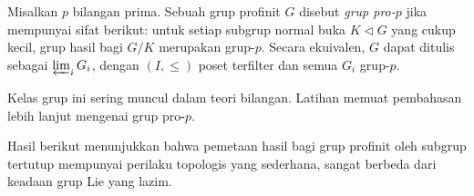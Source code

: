\begin{definition}
	Misalkan $p$ bilangan prima. Sebuah grup profinit $G$ disebut \emph{grup pro-$p$} jika mempunyai sifat berikut: untuk setiap subgrup normal buka $K \lhd G$ yang cukup kecil, grup hasil bagi $G/K$ merupakan grup-$p$. Secara ekuivalen, $G$ dapat ditulis sebagai $\varprojlim_i G_i$, dengan $(I, \leq)$ poset terfilter dan semua $G_i$ grup-$p$.
\end{definition}

Kelas grup ini sering muncul dalam teori bilangan. Latihan memuat pembahasan lebih lanjut mengenai grup pro-$p$.

Hasil berikut menunjukkan bahwa pemetaan hasil bagi grup profinit oleh subgrup tertutup mempunyai perilaku topologis yang sederhana, sangat berbeda dari keadaan grup Lie yang lazim.

